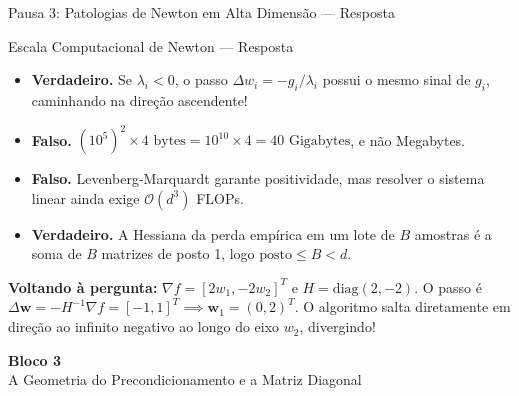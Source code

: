 \documentclass[aspectratio=169, 10pt]{beamer}
\newenvironment{callouttip}[1][Dica]{%
  \begin{exampleblock}{#1}%
}{%
  \end{exampleblock}%
}
\newcommand{\cmark}{\textcolor{green!60!black}{\textbf{\ding{51}}}}
\newcommand{\xmark}{\textcolor{red!70!black}{\textbf{\ding{55}}}}
\begin{document}
\begin{frame}{Pausa 3: Patologias de Newton em Alta Dimensão --- Resposta}
  \begin{callouttip}[Escala Computacional de Newton --- Resposta]
    \begin{itemize}
      \item[\cmark] \textbf{Verdadeiro.} Se $\lambda_i < 0$, o passo $\Delta w_i = -g_i/\lambda_i$ possui o mesmo sinal de $g_i$, caminhando na direção ascendente!
      \item[\xmark] \textbf{Falso.} $(10^5)^2 \times 4\text{ bytes} = 10^{10} \times 4 = 40\text{ Gigabytes}$, e não Megabytes.
      \item[\xmark] \textbf{Falso.} Levenberg-Marquardt garante positividade, mas resolver o sistema linear ainda exige $\mathcal{O}(d^3)$ FLOPs.
      \item[\cmark] \textbf{Verdadeiro.} A Hessiana da perda empírica em um lote de $B$ amostras é a soma de $B$ matrizes de posto 1, logo $\text{posto} \le B < d$.
    \end{itemize}
  \end{callouttip}
  \vspace{0.2cm}
  \textbf{Voltando à pergunta:} $\nabla f = [2w_1, -2w_2]^T$ e $H = \text{diag}(2, -2)$. O passo é $\Delta\mathbf{w} = -H^{-1}\nabla f = [-1, 1]^T \implies \mathbf{w}_1 = (0, 2)^T$. O algoritmo salta diretamente em direção ao infinito negativo ao longo do eixo $w_2$, divergindo!
\end{frame}

\begin{frame}[plain]
  \centering
  \vspace{2cm}
  {\Huge \textcolor{unicampblue}{\textbf{Bloco 3}}}\\
  \vspace{0.5cm}
  {\large \textcolor{unicampteal}{A Geometria do Precondicionamento e a Matriz Diagonal}}
\end{frame}
\end{document}
